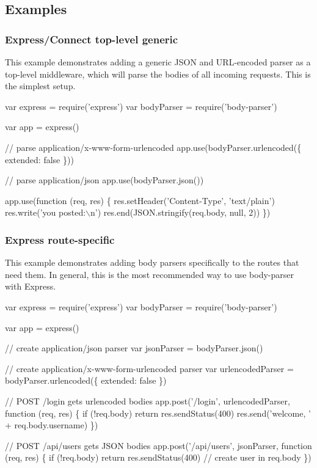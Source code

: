 \subsection*{Examples}

\subsubsection*{Express/\+Connect top-\/level generic}

This example demonstrates adding a generic J\+S\+ON and U\+R\+L-\/encoded parser as a top-\/level middleware, which will parse the bodies of all incoming requests. This is the simplest setup.


\begin{DoxyCode}
var express = require('express')
var bodyParser = require('body-parser')

var app = express()

// parse application/x-www-form-urlencoded
app.use(bodyParser.urlencoded(\{ extended: false \}))

// parse application/json
app.use(bodyParser.json())

app.use(function (req, res) \{
  res.setHeader('Content-Type', 'text/plain')
  res.write('you posted:\(\backslash\)n')
  res.end(JSON.stringify(req.body, null, 2))
\})
\end{DoxyCode}


\subsubsection*{Express route-\/specific}

This example demonstrates adding body parsers specifically to the routes that need them. In general, this is the most recommended way to use body-\/parser with Express.


\begin{DoxyCode}
var express = require('express')
var bodyParser = require('body-parser')

var app = express()

// create application/json parser
var jsonParser = bodyParser.json()

// create application/x-www-form-urlencoded parser
var urlencodedParser = bodyParser.urlencoded(\{ extended: false \})

// POST /login gets urlencoded bodies
app.post('/login', urlencodedParser, function (req, res) \{
  if (!req.body) return res.sendStatus(400)
  res.send('welcome, ' + req.body.username)
\})

// POST /api/users gets JSON bodies
app.post('/api/users', jsonParser, function (req, res) \{
  if (!req.body) return res.sendStatus(400)
  // create user in req.body
\})
\end{DoxyCode}


